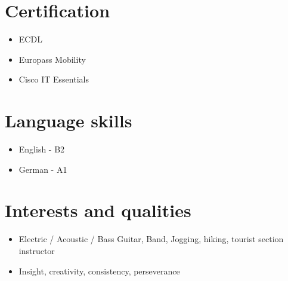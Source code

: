 \documentclass[12pt,a4paper]{article}
\begin{document}
\section*{Certification}

\begin{itemize}
  \item ECDL
  \item Europass Mobility
  \item Cisco IT Essentials
\end{itemize}

\section*{Language skills}

\begin{itemize}
  \item English - B2
  \item German - A1
\end{itemize}

\section*{Interests and qualities}

\begin{itemize}
  \item Electric / Acoustic / Bass Guitar, Band, Jogging,
  hiking, tourist section instructor
  \item Insight, creativity, consistency, perseverance
\end{itemize}
\end{document}
